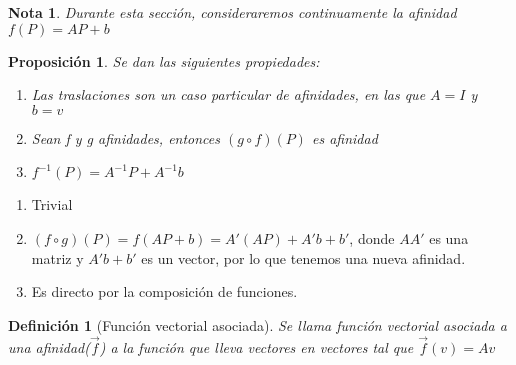 \documentclass[11pt, a4paper]{article}
\makeatletter
\newif\IfInSansMode
\let\oldsf\sffamily
\renewcommand*{\sffamily}{\oldsf\mathversion{sans}\InSansModetrue}
\let\oldnorm\normalfont
\renewcommand*{\normalfont}{\oldnorm\InSansModefalse\mathversion{normal}}
\renewenvironment{proof}[1][\proofname] {\vspace{-15pt}\par\pushQED{\qed}\normalfont\topsep6\p@\@plus6\p@\relax\trivlist\item[\hskip\labelsep\it#1\@addpunct{.}]\ignorespaces}{\popQED\endtrivlist\@endpefalse}
\renewcommand{\vec}{\overrightarrow}
\renewenvironment{proof}[1][\proofname] {\par\pushQED{\qed}\normalfont\topsep6\p@\@plus6\p@\relax\trivlist\item[\hskip\labelsep\itshape\sffamily#1\@addpunct{.}]\ignorespaces}{\popQED\endtrivlist\@endpefalse}
\theoremstyle{theorem-style}
\newtheorem{nprop}{Proposición}[section]
\theoremstyle{definition-style}
\newtheorem{ndef}{Definición}[section]
\theoremstyle{remark-style}
\newtheorem*{nota}{Nota}
\theoremstyle{example-style}
\newenvironment{nlist}
{\begin{enumerate}
    \renewcommand\labelenumi{(\emph{\roman{enumi})}}}
  {\end{enumerate}}
\makeatother
\begin{document}
\begin{nota}
  Durante esta sección, consideraremos continuamente la afinidad $f(P) = AP + b $
\end{nota}


\begin{nprop}
  Se dan las siguientes propiedades:
  \begin{nlist}
  \item Las traslaciones son un caso particular de afinidades, en las que $A = I$ y $b = v$
  \item Sean f y g afinidades, entonces $(g \circ f) (P)$ es afinidad
  \item $f^{-1}(P) = A^{-1}P +A^{-1}b$
    
  \end{nlist}
\end{nprop}
\begin{proof}
  \begin{nlist}
  \item Trivial
  \item $(f\circ g)(P) = f(AP +b) = A'(AP)+A'b +b' $, donde $AA'$ es una matriz y $A'b+b'$ es un vector, por lo que tenemos una nueva afinidad.
  \item Es directo por la composición de funciones.
  \end{nlist}
\end{proof}

\begin{ndef}[Función vectorial asociada]
  Se llama función vectorial asociada a una afinidad($\vec{f}$) a la función que lleva vectores en vectores tal que $\vec{f}(v) = Av$
\end{ndef}
\end{document}
